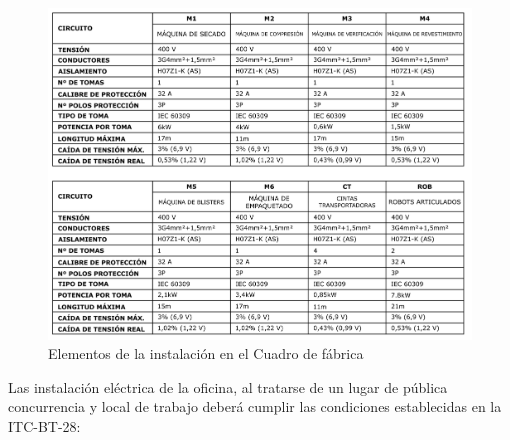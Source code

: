 \begin{figure}[!htb]
\centering
\includegraphics[width=1\textwidth]{Memoria/cuad3.png}
\caption{Elementos de la instalación en el Cuadro de fábrica}
\label{fig:digraph}
\end{figure}

\pagebreak

Las instalación eléctrica de la oficina, al tratarse de un lugar de pública concurrencia y local de trabajo deberá cumplir las condiciones establecidas en la ITC-BT-28: \\

